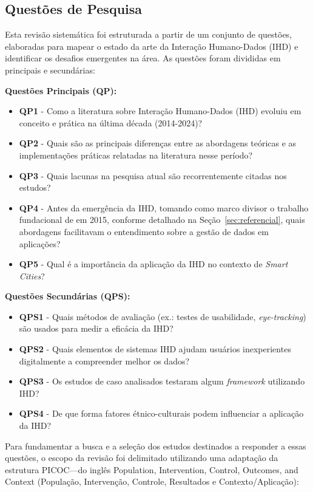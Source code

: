 \documentclass[12pt]{article}
\begin{document}
\subsection{Questões de Pesquisa}

 Esta revisão sistemática foi estruturada a partir de um conjunto de questões, elaboradas para mapear o estado da arte da Interação Humano-Dados (IHD) e identificar os desafios emergentes na área. As questões foram divididas em principais e secundárias:

\textbf{Questões Principais (QP):}
\begin{itemize}
\item \textbf{QP1} - Como a literatura sobre Interação Humano-Dados (IHD) evoluiu em conceito e prática na última década (2014-2024)?
\item \textbf{QP2} - Quais são as principais diferenças entre as abordagens teóricas e as implementações práticas relatadas na literatura nesse período?
\item \textbf{QP3} - Quais lacunas na pesquisa atual são recorrentemente citadas nos estudos?
\item \textbf{QP4} - Antes da emergência da IHD, tomando como marco divisor o trabalho fundacional de \cite{mortier2015humandatainteractionhumanface} em 2015, conforme detalhado na Seção~\ref{sec:referencial}, quais abordagens facilitavam o entendimento sobre a gestão de dados em aplicações?
\item \textbf{QP5} - Qual é a importância da aplicação da IHD no contexto de \textit{Smart Cities}?
\end{itemize}

\textbf{Questões Secundárias (QPS):}
\begin{itemize}
\item \textbf{QPS1} - Quais métodos de avaliação (ex.: testes de usabilidade, \textit{eye-tracking}) são usados para medir a eficácia da IHD?
\item \textbf{QPS2} - Quais elementos de sistemas IHD ajudam usuários inexperientes digitalmente a compreender melhor os dados?
\item \textbf{QPS3} - Os estudos de caso analisados testaram algum \textit{framework} utilizando IHD?
\item \textbf{QPS4} - De que forma fatores étnico-culturais podem influenciar a aplicação da IHD?
\end{itemize}

Para fundamentar a busca e a seleção dos estudos destinados a responder a essas questões, o escopo da revisão foi delimitado utilizando uma adaptação da estrutura PICOC---do inglês Population, Intervention, Control, Outcomes, and Context (População, Intervenção, Controle, Resultados e Contexto/Aplicação):
\end{document}
